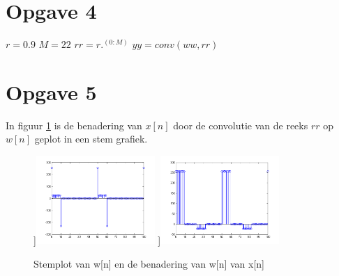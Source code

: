 \documentclass{article}
\begin{document}
\section{Opgave 4}
$r = 0.9$
$M = 22$
$rr = r .^ (0:M)$
$yy = conv(ww, rr)$

\section{Opgave 5}
In figuur \ref{fig:opgave5} is de benadering van $x[n]$ door de convolutie van de reeks $rr$ op $w[n]$ geplot in een stem grafiek.
\begin{figure}[h]
  \centering
 	\subfloat[][w[n]]{\includegraphics[width=0.4\textwidth]{content/5ww.png}}
	\subfloat[][y[n]]{\includegraphics[width=0.4\textwidth]{content/5yy.png}}
  \caption{Stemplot van w[n] en de benadering van w[n] van x[n]}
  \label{fig:opgave5}
\end{figure}
\end{document}

